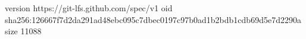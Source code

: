 version https://git-lfs.github.com/spec/v1
oid sha256:126667f7d2da291ad48ebc095c7dbec0197c97b0ad1b2bdb1cdb69d5e7d2290a
size 11088
